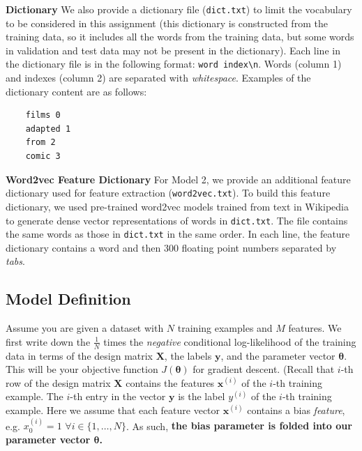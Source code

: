 \documentclass[11pt,addpoints,answers]{exam}
\newcommand{\xv}{\mathbf{x}}
\newcommand{\yv}{\mathbf{y}}
\newcommand{\Xv}{\mathbf{X}}
\newcommand{\thetav     }{\boldsymbol \theta     }
\begin{document}
  {\bf Dictionary } We also provide a dictionary file (\lstinline{dict.txt}) to limit the vocabulary to be considered in this assignment (this dictionary is constructed from the training data, so it includes all the words from the training data, but some words in validation and test data may not be present in the dictionary). Each line in the dictionary file is in the following format: \lstinline{word index\n}. Words (column 1) and indexes (column 2) are separated with \emph{whitespace}. Examples of the dictionary content are as follows: 
    \begin{lstlisting}
    films 0
    adapted 1
    from 2
    comic 3
    \end{lstlisting}
 
{\bf Word2vec Feature Dictionary } For Model 2, we provide an additional feature dictionary used for feature extraction (\texttt{word2vec.txt}). To build this feature dictionary, we used pre-trained word2vec models trained from text in Wikipedia to generate dense vector representations of words in \texttt{dict.txt}. The file contains the same words as those in \texttt{dict.txt} in the same order. In each line, the feature dictionary contains a word and then 300 floating point numbers separated by \emph{tabs}.
 
\subsection{Model Definition}\label{modeldescript}
 
 Assume you are given a dataset with $N$ training examples and $M$ features. We first write down the $\frac{1}{N}$ times the \emph{negative} conditional log-likelihood of the training data in terms of the design matrix $\Xv$, the labels $\yv$, and the parameter vector $\thetav$. This will be your objective function $J(\thetav)$ for gradient descent. 
%
(Recall that $i$-th row of the design matrix $\Xv$ contains the features $\xv^{(i)}$ of the $i$-th training example. The $i$-th entry in the vector $\yv$ is the label $y^{(i)}$ of the $i$-th training example.  Here we assume that each feature vector $\xv^{(i)}$ contains a bias \emph{feature}, e.g. $x_0^{(i)} = 1 \,\,\forall i \in \{1,\ldots,N\}$. As such, \textbf{the bias parameter is folded into our parameter vector $\thetav$.}
\end{document}
